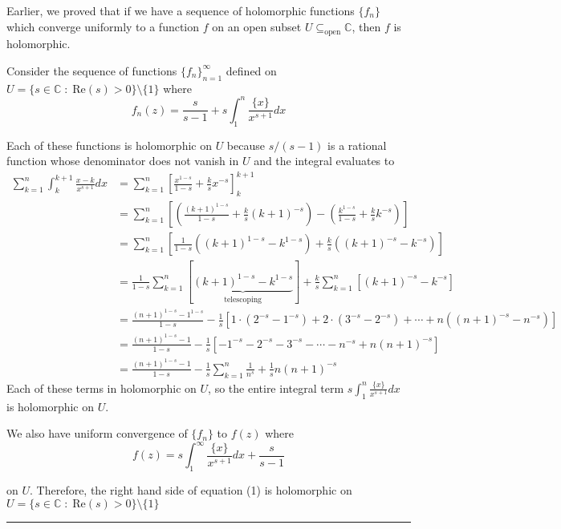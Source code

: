 \documentclass{article}
\newcommand{\C}{\mathbb{C}}
\begin{document}
\vskip 0.25cm
Earlier, we proved that if we have a sequence of holomorphic functions $\{f_n\}$ which converge uniformly to a function $f$ on an open subset $U \subseteq_{\text{open}} \C$, then $f$ is holomorphic.

\vskip 0.25cm
Consider the sequence of functions $\{f_n\}_{n = 1}^{\infty}$ defined on $U = \{s \in \C \;:\; \text{Re}(s) > 0\} \setminus \{1\}$ where
\[ f_n(z) = \frac{s}{s-1} + s\int_{1}^{n} \frac{\{x\}}{x^{s+1}} dx \]

Each of these functions is holomorphic on $U$ because $s/(s-1)$ is a rational function whose denominator does not vanish in $U$ and the integral evaluates to 
\begin{align*}
  \sum_{k = 1}^{n} \int_{k}^{k+1} \frac{x - k}{x^{s+1}} dx &= \sum_{k = 1}^{n} \left[ \frac{x^{1-s}}{1-s} + \frac{k}{s} x^{-s} \right]_{k}^{k+1} \\
  &= \sum_{k = 1}^{n} \left[ \left(\frac{(k+1)^{1-s}}{1-s} + \frac{k}{s} (k+1)^{-s}\right) - \left(\frac{k^{1-s}}{1-s} + \frac{k}{s} k^{-s}\right) \right] \\
  &= \sum_{k = 1}^{n} \left[ \frac{1}{1-s} \left( (k+1)^{1-s} - k^{1-s} \right) + \frac{k}{s} \left( (k+1)^{-s} - k^{-s} \right) \right] \\
  &= \frac{1}{1-s}\sum_{k = 1}^{n}\left[ \underbrace{(k+1)^{1-s} - k^{1-s} }_{\text{telescoping}} \right] + \frac{k}{s} \sum_{k = 1}^{n} \left[ (k+1)^{-s} - k^{-s} \right] \\
  &= \frac{(n+1)^{1-s} - 1^{1-s}}{1-s} - \frac{1}{s} \left[1 \cdot \left(2^{-s} - 1^{-s}\right) + 2 \cdot \left(3^{-s} - 2^{-s}\right) + \cdots + n\left((n+1)^{-s} - n^{-s}\right)\right] \\
  &= \frac{(n+1)^{1-s} - 1}{1-s} - \frac{1}{s} \left[-1^{-s} - 2^{-s} - 3^{-s} - \cdots -n^{-s} + n(n+1)^{-s}\right] \\
  &= \frac{(n+1)^{1-s} - 1}{1-s} - \frac{1}{s}\sum_{k = 1}^{n} \frac{1}{n^s} + \frac{1}{s} n(n+1)^{-s}
\end{align*}
Each of these terms in holomorphic on $U$, so the entire integral term $s \int_1^n \frac{\{x\}}{x^{s+1}} dx$ is holomorphic on $U$.

\vskip 0.25cm
We also have uniform convergence of $\{f_n\}$ to $f(z)$ where 
\[ f(z) = s\int_{1}^{\infty} \frac{\{x\}}{x^{s+1}} dx + \frac{s}{s-1}  \]

on $U$. Therefore, the right hand side of equation (1) is holomorphic on $U = \{s \in \C \;:\; \text{Re}(s) > 0\} \setminus \{1\}$

\vskip 0.5cm
\hrule 
\vskip 0.5cm
\end{document}
